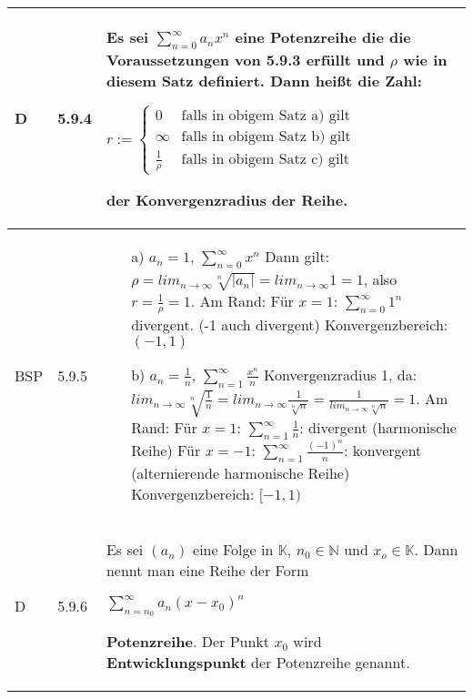 \begin{longtable}{p{0.75cm} p{1cm} p{16cm}}
        \midrule
        D   & 5.9.4 &   Es sei $\sum^{\infty}_{n=0} a_nx^n$ eine Potenzreihe die die Voraussetzungen von 5.9.3 erfüllt und $\rho$ wie in diesem Satz 
                        definiert. Dann heißt die Zahl: \hfill \break
                        \centerline{$r:=    \begin{cases}
                                            0 & \text{falls in obigem Satz a) gilt} \\
                                            \infty & \text{falls in obigem Satz b) gilt} \\
                                            \frac{1}{\rho} & \text{falls in obigem Satz c) gilt}
                                            \end{cases}$ }
                        der \textbf{Konvergenzradius} der Reihe. \\
        \midrule
        BSP & 5.9.5 &   \begin{itemize}[topsep=-0.5cm]
            \item[a)] $a_n = 1$, $\sum^{\infty}_{n=0} x^n$ \hfill \break
                        Dann gilt: $\rho = lim_{n \rightarrow \infty} \sqrt[n]{|a_n|} = lim_{n \rightarrow \infty} 1 = 1$, also $r = \frac{1}{\rho} = 1$. \hfill \break
                        Am Rand: Für $x=1$: $\sum^{\infty}_{n=0} 1^n$ divergent. (-1 auch divergent) \hfill \break
                        Konvergenzbereich: $(-1,1)$
            \item[b)] $a_n = \frac{1}{n}$, $\sum^{\infty}_{n=1} \frac{x^n}{n}$ \hfill \break
                        Konvergenzradius 1, da: $lim_{n \rightarrow \infty} \sqrt[n]{\frac{1}{n}} = lim_{n \rightarrow \infty} \frac{1}{\sqrt[n]{n}}
                        = \frac{1}{lim_{n \rightarrow \infty} \sqrt[n]{n}} = 1$. \hfill \break
                        Am Rand: Für $x=1$: $\sum^{\infty}_{n=1} \frac{1}{n}$: divergent (harmonische Reihe) \hfill \break
                        Für $x=-1$: $\sum^{\infty}_{n=1} \frac{(-1)^n}{n}$: konvergent (alternierende harmonische Reihe) \hfill \break
                        Konvergenzbereich: $[-1,1)$
        \end{itemize} \vspace{-0cm} \\
        \midrule
        D   & 5.9.6 &   Es sei $(a_n)$ eine Folge in $\mathbb{K}$, $n_0 \in \mathbb{N}$ und $x_o \in \mathbb{K}$. Dann nennt man eine Reihe der Form \hfill \break
                        \centerline{$\sum^{\infty}_{n=n_0}a_n(x-x_0)^n$}
                        \textbf{Potenzreihe}. Der Punkt $x_0$ wird \textbf{Entwicklungspunkt} der Potenzreihe genannt. \hfill \break

\end{longtable}
